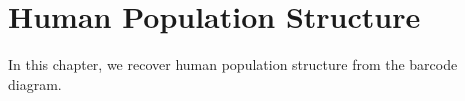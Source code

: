 
\chapter{Human Population Structure}
\label{ch:human_population_structre}

In this chapter, we recover human population structure from the barcode diagram.

\lipsum
